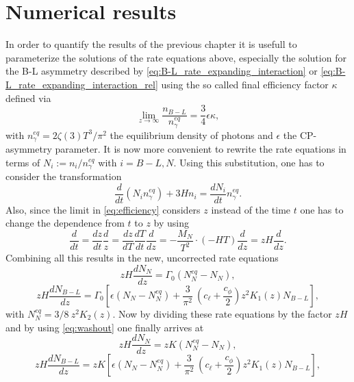 \chapter{Numerical results}
In order to quantify the results of the previous chapter it is usefull to parameterize the solutions of the rate equations above, especially the solution for the B-L asymmetry described by \eqref{eq:B-L_rate_expanding_interaction} or \eqref{eq:B-L_rate_expanding_interaction_rel} using the so called final efficiency factor $\kappa$ defined via
\begin{equation}
\lim\limits_{z\rightarrow\infty}\frac{n_{B-L}}{n_\gamma^{eq}}=\frac{3}{4}\epsilon\kappa,
\label{eq:efficiency}
\end{equation}
with $n_\gamma^{eq}=2\zeta(3)T^3/\pi^2$ the equilibrium density of photons and $\epsilon$ the CP-asymmetry parameter. It is now more convenient to rewrite the rate equations in terms of $N_i:=n_i/n_\gamma^{eq}$ with $i=B-L,N$. Using this substitution, one has to consider the transformation \cite[Eq. 7.1]{Wormann:2016yyi}
\begin{equation}
\frac{d}{dt}(N_in_\gamma^{eq})+3Hn_i=\frac{dN_i}{dt}n_\gamma^{eq}.
\end{equation}
Also, since the limit in \eqref{eq:efficiency} considers $z$ instead of the time $t$ one has to change the dependence from $t$ to $z$ by using
\begin{equation}
\frac{d}{dt}=\frac{dz}{dt}\frac{d}{z}=\frac{dz}{dT}\frac{dT}{dt}\frac{d}{dz}=-\frac{M_N}{T^2}\cdot(-HT)\frac{d}{dz}=zH\frac{d}{dz}.
\end{equation}
Combining all this results in the new, uncorrected rate equations
\begin{equation*}
zH\frac{dN_N}{dz}=\Gamma_0\left(N_N^{eq}-N_N\right),
\end{equation*}
\begin{equation*}
zH\frac{dN_{B-L}}{dz}=\Gamma_0\left[\epsilon\left(N_N-N_N^{eq}\right)+\frac{3}{\pi^2}\:\left(c_\ell+\frac{c_\phi}{2}\right)z^2K_1(z)N_{B-L}\right],
\end{equation*}
with $N_N^{eq}=3/8\:z^2K_2(z)$.
Now by dividing these rate equations by the factor $zH$ and by using \eqref{eq:washout} one finally arrives at
\begin{equation}
zH\frac{dN_N}{dz}=zK\left(N_N^{eq}-N_N\right),
\end{equation}
\begin{equation}
zH\frac{dN_{B-L}}{dz}=zK\left[\epsilon\left(N_N-N_N^{eq}\right)+\frac{3}{\pi^2}\:\left(c_\ell+\frac{c_\phi}{2}\right)z^2K_1(z)N_{B-L}\right],
\end{equation}\newpage
